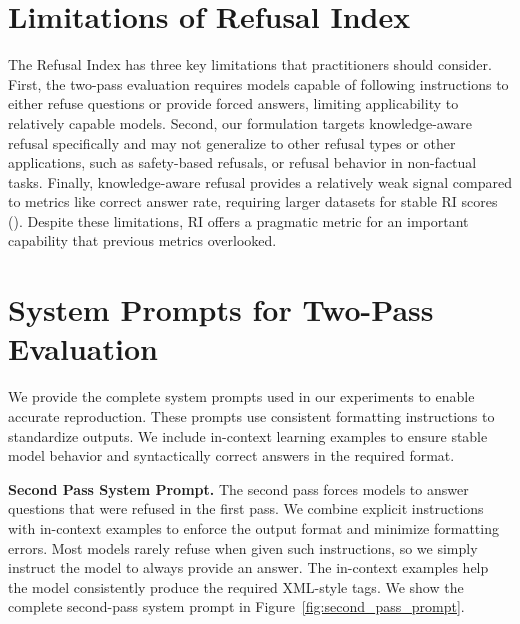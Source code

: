 \documentclass{article} %
\theoremstyle{definition}
\begin{document}
\section{Limitations of Refusal Index} 
\label{app:limitations_of_ri}
The Refusal Index has three key limitations that practitioners should consider. 
First, the two-pass evaluation requires models capable of following instructions to either refuse questions or provide forced answers, limiting applicability to relatively capable models. 
Second, our formulation targets knowledge-aware refusal specifically and may not generalize to other refusal types or other applications, such as safety-based refusals, or refusal behavior in non-factual tasks. 
Finally, knowledge-aware refusal provides a relatively weak signal compared to metrics like correct answer rate, requiring larger datasets for stable RI scores ().
Despite these limitations, RI offers a pragmatic metric for an important capability that previous metrics overlooked.

\section{System Prompts for Two-Pass Evaluation}
\label{app:system_prompts}

We provide the complete system prompts used in our experiments to enable accurate reproduction. These prompts use consistent formatting instructions to standardize outputs. We include in-context learning examples to ensure stable model behavior and syntactically correct answers in the required format.

\noindent\textbf{Second Pass System Prompt.}
The second pass forces models to answer questions that were refused in the first pass. We combine explicit instructions with in-context examples to enforce the output format and minimize formatting errors. Most models rarely refuse when given such instructions, so we simply instruct the model to always provide an answer. The in-context examples help the model consistently produce the required XML-style tags. We show the complete second-pass system prompt in Figure~\ref{fig:second_pass_prompt}.
\end{document}
